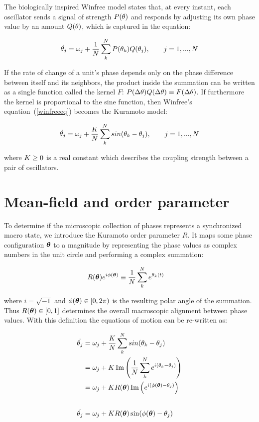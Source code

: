 The biologically inspired Winfree model states that, at every instant, each oscillator sends a signal of strength $P(\theta)$ and
responds by adjusting its own phase value by an amount $Q(\theta)$, which is captured in the equation:

\begin{equation}
    \dot{\theta_j} = \omega_j + \frac{1}{N}\sum^{N}_{k}P(\theta_k)Q(\theta_j), \qquad j=1,...,N
    \label{winfreeeq}
\end{equation}

If the rate of change of a unit's phase depends only on the phase difference between itself and its neighbors, the product inside the
summation can be written as a single function called the kernel $F$: $P(\Delta \theta)Q(\Delta \theta) \equiv F(\Delta \theta)$. If
furthermore the kernel is proportional to the sine function, then Winfree's equation~(\ref{winfreeeq}) becomes the Kuramoto model:

\begin{equation}
    \dot{\theta_j} = \omega_j + \frac{K}{N}\sum^{N}_{k}sin(\theta_k - \theta_j), \qquad j=1,...,N
    \label{kura}
\end{equation}

\noindent where $K \geq 0$ is a real constant which describes the coupling strength between a pair of oscillators.

\section{Mean-field and order parameter}

To determine if the microscopic collection of phases represents a synchronized macro state, we introduce the Kuramoto order parameter
$R$. It maps some phase configuration $\bm{\theta}$ to a magnitude by representing the phase values as complex numbers in the unit
circle and performing a complex summation:

\begin{align}
    R(\bm{\theta})e^{i\phi(\bm{\theta})} &\equiv \frac{1}{N} \sum^{N}_{k} e^{\theta_k(t)}
    \label{kuramotoop}
\end{align}

\noindent where $i=\sqrt{-1}$ and $\phi(\bm{\theta})\in[0,2\pi)$ is the resulting polar angle of the summation. Thus $R( \bm{\theta})
\in [0,1]$ determines the overall macroscopic alignment between phase values. With this definition the equations of motion can be
re-written as:

\begin{align}
    \dot{\theta_j} &= \omega_j + \frac{K}{N}\sum^{N}_{k}sin(\theta_k - \theta_j) \notag \\
                   &= \omega_j + K \operatorname{Im}\left( \frac{1}{N}\sum^{N}_{k} e^{i(\theta_k-\theta_j)} \right) \notag \\
                   &= \omega_j + K R(\bm{\theta}) \operatorname{Im}\left( e^{i(\phi(\bm{\theta}) - \theta_j)} \right) \notag \\[18pt]
    \dot{\theta_j} &= \omega_j + K R(\bm{\theta}) \sin ( \phi(\bm{\theta}) - \theta_j )
    \label{kuramf}
\end{align}

